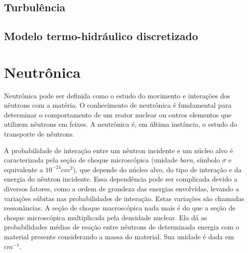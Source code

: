 \subsection{Turbulência}
\label{subsec:}

\subsection{Modelo termo-hidráulico discretizado}
\label{subsec:modeloth}



\section{Neutrônica}
\label{sec:neutronica}

Neutrônica pode ser definida como o estudo do movimento e interações dos nêutrons
com a matéria. O conhecimento de neutrônica é fundamental para determinar o
comportamento de um reator nuclear ou outros elementos que utilizem nêutrons
em feixes. A neutrônica é, em última instância, o estudo do transporte de nêutrons.

A probabilidade de interação entre um nêutron incidente e um núcleo alvo é caracterizada
pela seção de choque microscópica (unidade \textit{barn}, símbolo $\sigma$ e
equivalente a $10^{-24} cm^2$), que depende do núcleo alvo, do tipo de interação e da
energia do nêutron incidente. Essa dependência pode ser complicada devido a diversos fatores,
como a ordem de grandeza das energias envolvidas, levando a variações súbitas nas probabilidades
de interação. Estas variações são chamadas ressonâncias. A seção de choque macroscópica nada mais
é do que a seção de choque microscópica multiplicada pela densidade nuclear. Ela dá as probabilidades
médias de reação entre nêutrons de determinada energia com o material presente considerando a massa
do material. Sua unidade é dada em $cm^{-1}$.


